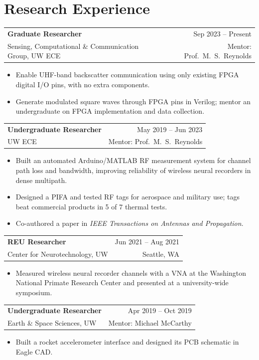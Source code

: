 \documentclass[10pt,letterpaper]{article}
\makeatletter
\newcommand{\job}[4]{%
  \begin{tabularx}{\linewidth}{@{}X r@{}}
    \textbf{#1} & \textcolor{muted}{#2}\\
    \textcolor{accent}{#3} & \textcolor{muted}{\small #4}
  \end{tabularx}\par}
\makeatother
\begin{document}
\section{Research Experience}
\job{Graduate Researcher}{Sep 2023 -- Present}{Sensing, Computational \& Communication Group, UW ECE}{Mentor: Prof.\ M.\ S.\ Reynolds}
\begin{itemize}
  \item Enable UHF-band backscatter communication using only existing FPGA digital I/O pins, with no extra components.
  \item Generate modulated square waves through FPGA pins in Verilog; mentor an undergraduate on FPGA implementation and data collection.
\end{itemize}
\vspace{4pt}
\job{Undergraduate Researcher}{May 2019 -- Jun 2023}{UW ECE}{Mentor: Prof.\ M.\ S.\ Reynolds}
\begin{itemize}
  \item Built an automated Arduino/MATLAB RF measurement system for channel path loss and bandwidth, improving reliability of wireless neural recorders in dense multipath.
  \item Designed a PIFA and tested RF tags for aerospace and military use; tags beat commercial products in 5 of 7 thermal tests.
  \item Co-authored a paper in \textit{IEEE Transactions on Antennas and Propagation}.
\end{itemize}
\vspace{4pt}
\job{REU Researcher}{Jun 2021 -- Aug 2021}{Center for Neurotechnology, UW}{Seattle, WA}
\begin{itemize}
  \item Measured wireless neural recorder channels with a VNA at the Washington National Primate Research Center and presented at a university-wide symposium.
\end{itemize}
\vspace{4pt}
\job{Undergraduate Researcher}{Apr 2019 -- Oct 2019}{Earth \& Space Sciences, UW}{Mentor: Michael McCarthy}
\begin{itemize}
  \item Built a rocket accelerometer interface and designed its PCB schematic in Eagle CAD.
\end{itemize}
\end{document}
